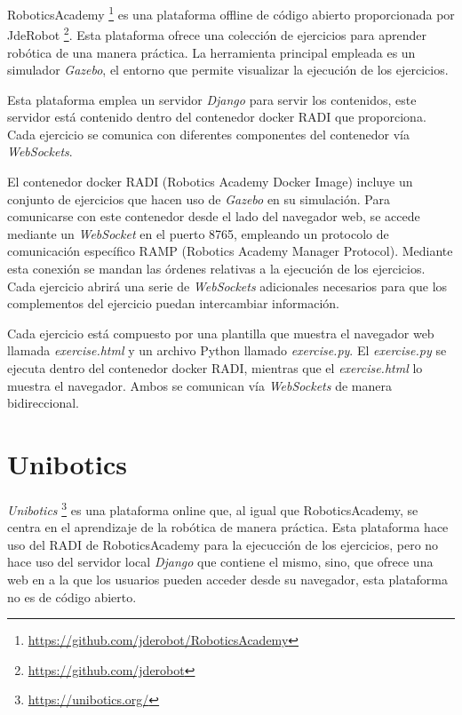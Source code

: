 \documentclass[a4paper, 12pt]{book}
\begin{document}
RoboticsAcademy \footnote{\url{https://github.com/jderobot/RoboticsAcademy}} es una plataforma offline de código abierto proporcionada por JdeRobot \footnote{\url{https://github.com/jderobot}}. Esta plataforma ofrece una colección de ejercicios para aprender robótica de una manera práctica. La herramienta principal empleada es un simulador \emph{Gazebo}, el entorno que permite visualizar la ejecución de los ejercicios.


Esta plataforma emplea un servidor \emph{Django} para servir los contenidos, este servidor está contenido dentro del contenedor docker RADI que proporciona. Cada ejercicio se comunica con diferentes componentes del contenedor vía \emph{WebSockets}.

El contenedor docker RADI (Robotics Academy Docker Image) incluye un conjunto de ejercicios que hacen uso de \emph{Gazebo} en su simulación. Para comunicarse con este contenedor desde el lado del navegador web, se accede mediante un \emph{WebSocket} en el puerto 8765, empleando un protocolo de comunicación específico RAMP (Robotics Academy Manager Protocol). Mediante esta conexión se mandan las órdenes relativas a la ejecución de los ejercicios. Cada ejercicio abrirá una serie de \emph{WebSockets} adicionales necesarios para que los complementos del ejercicio puedan intercambiar información.

Cada ejercicio está compuesto por una plantilla que muestra el navegador web llamada \emph{exercise.html} y un archivo Python llamado \emph{exercise.py}. El \emph{exercise.py} se ejecuta dentro del contenedor docker RADI, mientras que el \emph{exercise.html} lo muestra el navegador. Ambos se comunican vía \emph{WebSockets} de manera bidireccional.

\section{Unibotics}
\label{section:unibotics}

\emph{Unibotics} \footnote{\url{https://unibotics.org/}} es una plataforma online que, al igual que RoboticsAcademy, se centra en el aprendizaje de la robótica de manera práctica. Esta plataforma hace uso del RADI de RoboticsAcademy para la ejecucción de los ejercicios, pero no hace uso del servidor local \emph{Django} que contiene el mismo, sino, que ofrece una web en a la que los usuarios pueden acceder desde su navegador, esta plataforma no es de código abierto.
\end{document}

